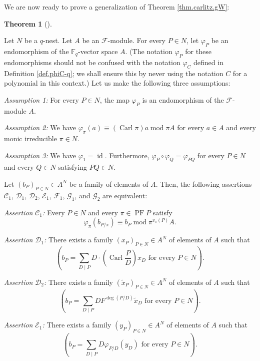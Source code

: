 \documentclass[numbers=enddot,12pt,final,onecolumn,notitlepage]{scrartcl}%
\theoremstyle{definition}
\newtheorem{theo}{Theorem}[section]
\newenvironment{theorem}[1][]
{\begin{theo}[#1]\begin{leftbar}}
{\end{leftbar}\end{theo}}
\let\sumnonlimits\sum
\renewcommand{\sum}{\sumnonlimits\limits}
\begin{document}
We are now ready to prove a generalization of Theorem \ref{thm.carlitz.gW}:

\begin{theorem}
\label{thm.F.gW}Let $N$ be a $q$-nest. Let $A$ be an $\mathcal{F}$-module. For
every $P\in N$, let $\varphi_{P}$ be an endomorphism of the $\mathbb{F}_{q}%
$-vector space $A$. (The notation $\varphi_{P}$ for these endomorphisms should
not be confused with the notation $\varphi_{C}$ defined in Definition
\ref{def.phiC-q}; we shall ensure this by never using the notation $C$ for a
polynomial in this context.) Let us make the following three assumptions:

\textit{Assumption 1:} For every $P\in N$, the map $\varphi_{P}$ is an
endomorphism of the $\mathcal{F}$-module $A$.

\textit{Assumption 2:} We have $\varphi_{\pi}\left(  a\right)  \equiv\left(
\operatorname*{Carl}\pi\right)  a\operatorname{mod}\pi A$ for every $a\in A$
and every monic irreducible $\pi\in N$.

\textit{Assumption 3:} We have $\varphi_{1}=\operatorname*{id}$. Furthermore,
$\varphi_{P}\circ\varphi_{Q}=\varphi_{PQ}$ for every $P\in N$ and every $Q\in
N$ satisfying $PQ\in N$.

Let $\left(  b_{P}\right)  _{P\in N}\in A^{N}$ be a family of elements of $A$.
Then, the following assertions $\mathcal{C}_{1}$, $\mathcal{D}_{1}$,
$\mathcal{D}_{2}$, $\mathcal{E}_{1}$, $\mathcal{F}_{1}$, $\mathcal{G}_{1}$,
and $\mathcal{G}_{2}$ are equivalent:

\textit{Assertion }$\mathcal{C}_{1}$\textit{:} Every $P\in N$ and every
$\pi\in\operatorname{PF}P$ satisfy%
\[
\varphi_{\pi}\left(  b_{P / \pi}\right)  \equiv b_{P}\operatorname{mod}%
\pi^{v_{\pi}\left(  P\right)  }A.
\]


\textit{Assertion }$\mathcal{D}_{1}$\textit{:} There exists a family $\left(
x_{P}\right)  _{P\in N}\in A^{N}$ of elements of $A$ such that%
\[
\left(  b_{P}=\sum_{D\mid P}D\cdot\left(  \operatorname*{Carl}\dfrac{P}%
{D}\right)  x_{D}\text{ for every }P\in N\right)  .
\]


\textit{Assertion }$\mathcal{D}_{2}$\textit{:} There exists a family $\left(
\widetilde{x}_{P}\right)  _{P\in N}\in A^{N}$ of elements of $A$ such that%
\[
\left(  b_{P}=\sum_{D\mid P}DF^{\deg\left(  P/D\right)  }\widetilde{x}%
_{D}\text{ for every }P\in N\right)  .
\]


\textit{Assertion }$\mathcal{E}_{1}$\textit{:} There exists a family $\left(
y_{P}\right)  _{P\in N}\in A^{N}$ of elements of $A$ such that%
\[
\left(  b_{P}=\sum_{D\mid P}D\varphi_{P / D}\left(  y_{D}\right)  \text{ for
every }P\in N\right)  .
\]



\end{theorem}
\end{document}
